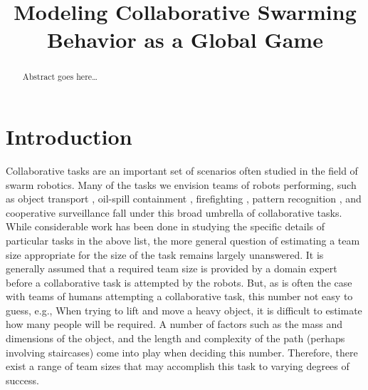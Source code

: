 \documentclass[conference]{ieeeconf}
\begin{document}
\title{Modeling Collaborative Swarming Behavior as a Global Game}

\author{
\and
{}
}

\maketitle

\begin{abstract}
Abstract goes here\ldots
\end{abstract}

\IEEEpeerreviewmaketitle

\section{Introduction}\label{sec:intro}
Collaborative tasks are an important set of scenarios often studied in the field of swarm robotics. Many of the tasks we envision teams of robots performing, such as object transport \cite{sugawara2012}, oil-spill containment \cite{beni2005swarm}, firefighting \cite{Krishnanand2006}, pattern recognition  \cite{beni1993swarm}, and cooperative surveillance fall under this broad umbrella of collaborative tasks. While considerable work has been done in studying the specific details of particular tasks in the above list, the more general question of estimating a team size appropriate for the size of the task remains largely unanswered. It is generally assumed that a required team size is provided by a domain expert before a collaborative task is attempted by the robots. But, as is often the case with teams of humans attempting a collaborative task, this number not easy to guess, e.g., When trying to lift and move a heavy object, it is difficult to estimate how many people will be required. A number of factors such as the mass and dimensions of the object, and the length and complexity of the path (perhaps involving staircases) come into play when deciding this number. Therefore, there exist a range of team sizes that may accomplish this task to varying degrees of success.
\end{document}
